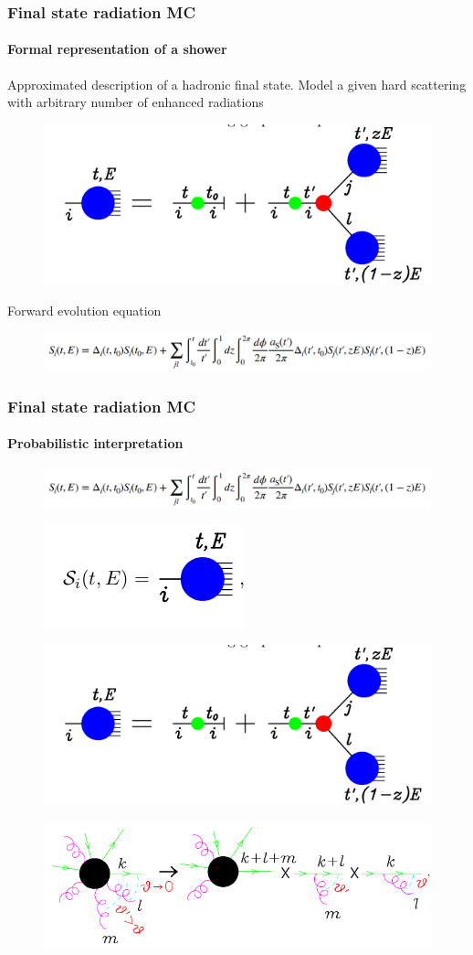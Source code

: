 \documentclass[aspectratio=43]{beamer}
\begin{document}
\begin{frame}

	\frametitle{Final state radiation MC}
	\framesubtitle{Formal representation of a shower}
	
	Approximated description of a hadronic final state. Model a given hard scattering with arbitrary number of enhanced radiations
	
	\begin{figure}
		\includegraphics[width = 6 cm]{plots/shower_2.png}
	\end{figure}
		
	Forward evolution equation
	\begin{figure}
		\includegraphics[width = 10 cm]{plots/shower_0.png}
	\end{figure}

\end{frame}

\begin{frame}

	\frametitle{Final state radiation MC}
	\framesubtitle{Probabilistic interpretation}
	
	\begin{figure}
		\includegraphics[width = 3 cm]{plots/shower_0.png}
	\end{figure}
	
	\begin{figure}
		\includegraphics[width = 3 cm]{plots/shower_1.png}
	\end{figure}

	\begin{figure}
		\includegraphics[width = 3 cm]{plots/shower_2.png}
	\end{figure}

	\begin{figure}
		\includegraphics[width = 3 cm]{plots/shower_4.png}
	\end{figure}


\end{frame}
\end{document}
